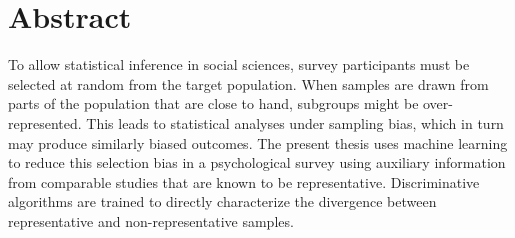 \chapter*{Abstract}
\thispagestyle{empty}
To allow statistical inference in social sciences, survey participants must be selected at random from the target population. When samples are drawn from parts of the population that are close to hand, subgroups might be over-represented. This leads to statistical analyses under sampling bias, which in turn may produce similarly biased outcomes. The present thesis uses machine learning to reduce this selection bias in a psychological survey using auxiliary information from comparable studies that are known to be representative. Discriminative algorithms are trained to directly characterize the divergence between representative and non-representative samples.



